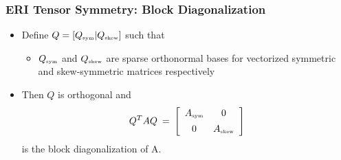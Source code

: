 \documentclass[bigger]{beamer}
\begin{document}
\begin{frame}
\frametitle{ERI Tensor Symmetry: Block Diagonalization}
\label{sec-1-20}
\begin{itemize}

\item Define $Q=\left[Q_{\mbox{\tiny sym}}|Q_{\mbox{\tiny skew}} \right]$ such that
\label{sec-1-20-1}%
\begin{itemize}

\item $Q_{\mbox{\tiny sym}}$ and $Q_{\mbox{\tiny skew}}$ are sparse orthonormal bases for vectorized symmetric and skew-symmetric matrices respectively
\label{sec-1-20-1-1}%
\end{itemize} %

\item Then $Q$ is orthogonal and\\
\label{sec-1-20-2}%
\[
Q^{T}AQ \:=\: 
\left[ \begin{array}{cc} A_{\mbox{\tiny sym}} & 0 \\ 0 & A_{\mbox{\tiny skew}} \rule{0pt}{13pt}
\end{array}\right]
\]
is the block diagonalization of A.
\end{itemize} %
\end{frame}
\end{document}
